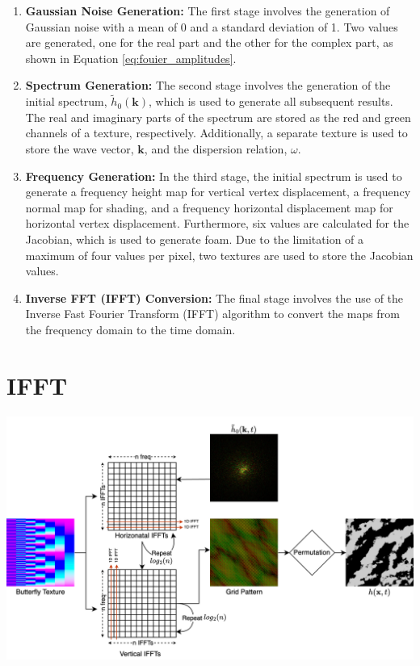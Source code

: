 \begin{enumerate}
    \item \textbf{Gaussian Noise Generation:} The first stage involves the generation of Gaussian noise with a mean of 0 and a standard deviation of 1. Two values are generated, one for the real part and the other for the complex part, as shown in Equation \ref{eq:fouier_amplitudes}.
    \item \textbf{Spectrum Generation:} The second stage involves the generation of the initial spectrum, $\tilde{h}_0(\mathbf{k})$, which is used to generate all subsequent results. The real and imaginary parts of the spectrum are stored as the red and green channels of a texture, respectively. Additionally, a separate texture is used to store the wave vector, $\mathbf{k}$, and the dispersion relation, $\omega$.
    \item \textbf{Frequency Generation:} In the third stage, the initial spectrum is used to generate a frequency height map for vertical vertex displacement, a frequency normal map for shading, and a frequency horizontal displacement map for horizontal vertex displacement. Furthermore, six values are calculated for the Jacobian, which is used to generate foam. Due to the limitation of a maximum of four values per pixel, two textures are used to store the Jacobian values.
    \item \textbf{Inverse FFT (IFFT) Conversion:} The final stage involves the use of the Inverse Fast Fourier Transform (IFFT) algorithm to convert the maps from the frequency domain to the time domain.
\end{enumerate}

\section{IFFT}

\begin{minipage}{1\textwidth}
    \centering
    \includegraphics[width=1\textwidth]{"images/ifft_algorithm.png"}
    \label{fig:ifft_algorithm}
\end{minipage}

